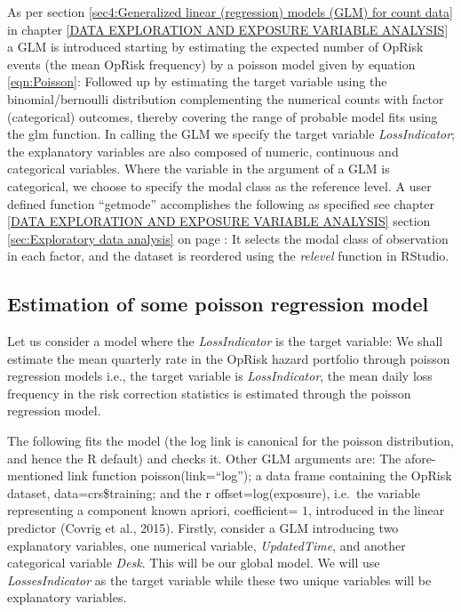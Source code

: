 \documentclass{DissertateUSU}
\begin{document}
As per section
\ref{sec4:Generalized linear (regression) models (GLM) for count data}
in chapter \ref{DATA EXPLORATION AND EXPOSURE VARIABLE ANALYSIS} a GLM
is introduced starting by estimating the expected number of OpRisk
events (the mean OpRisk frequency) by a poisson model given by equation
\ref{eqn:Poisson}: Followed up by estimating the target variable using
the binomial/bernoulli distribution complementing the numerical counts
with factor (categorical) outcomes, thereby covering the range of
probable model fits using the glm function. In calling the GLM we
specify the target variable \emph{LossIndicator}; the explanatory
variables are also composed of numeric, continuous and categorical
variables. Where the variable in the argument of a GLM is categorical,
we choose to specify the modal class as the reference level. A user
defined function ``getmode'' accomplishes the following as specified see
chapter \ref{DATA EXPLORATION AND EXPOSURE VARIABLE ANALYSIS} section
\ref{sec:Exploratory data analysis} on page
\pageref{sec:Exploratory data analysis}: It selects the modal class of
observation in each factor, and the dataset is reordered using the
\emph{relevel} function in RStudio.

\singlespacing

\doublespacing

\subsection{Estimation of some poisson regression model}
\label{ssec: Estimation of some poisson regression model}

Let us consider a model where the \emph{LossIndicator} is the target
variable: We shall estimate the mean quarterly rate in the OpRisk hazard
portfolio through poisson regression models i.e., the target variable is
\emph{LossIndicator}, the mean daily loss frequency in the risk
correction statistics is estimated through the poisson regression
model.\medskip

The following fits the model (the log link is canonical for the poisson
distribution, and hence the R default) and checks it. Other GLM
arguments are: The afore-mentioned link function poisson(link=``log'');
a data frame containing the OpRisk dataset, data=crs\$training; and the
r offset=log(exposure), i.e.~the variable representing a component known
apriori, coefficient= \(1\), introduced in the linear predictor (Covrig
et al., 2015). Firstly, consider a GLM introducing two explanatory
variables, one numerical variable, \emph{UpdatedTime}, and another
categorical variable \emph{Desk}. This will be our global model. We will
use \emph{LossesIndicator} as the target variable while these two unique
variables will be explanatory variables.
\end{document}
